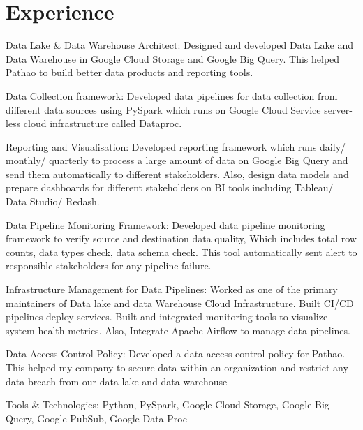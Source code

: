 \documentclass[letterpaper]{deedy-resume} %
\begin{document}
\begin{minipage}[t]{0.66\textwidth} %


\section{Experience}


\vspace{\topsep} %
\begin{tightitemize}
\sectionspace
\item Data Lake & Data Warehouse Architect:
Designed and developed Data Lake and Data Warehouse in Google Cloud Storage and Google Big Query. This helped Pathao to build better data products and reporting tools.
\item Data Collection framework:
Developed data pipelines for data collection from different data sources using PySpark which runs on Google Cloud Service server-less cloud infrastructure called Dataproc.
\item Reporting and Visualisation:
Developed reporting framework which runs daily/ monthly/ quarterly to process a large amount of data on Google Big Query and send them automatically to different stakeholders. Also, design data models and prepare dashboards for different stakeholders on BI tools including Tableau/ Data Studio/ Redash.
\item Data Pipeline Monitoring Framework:
Developed data pipeline monitoring framework to verify source and destination data quality, Which includes total row counts, data types check, data schema check. This tool automatically sent alert to responsible stakeholders for any pipeline failure.
\item Infrastructure Management for Data Pipelines:
Worked as one of the primary maintainers of Data lake and data Warehouse Cloud Infrastructure. Built CI/CD pipelines deploy services. Built and integrated monitoring tools to visualize system health metrics. Also, Integrate Apache Airflow to manage data pipelines.
\item Data Access Control Policy:
Developed a data access control policy for Pathao. This helped my company to secure data within an organization and restrict any data breach from our data lake and data warehouse
\item Tools & Technologies: Python, PySpark, Google Cloud Storage, Google Big Query, Google PubSub, Google Data Proc
\end{tightitemize}


\end{minipage}
\end{document}
